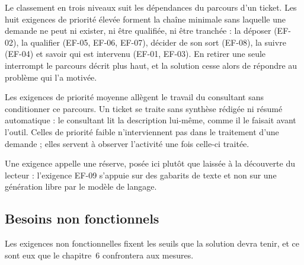 
Le classement en trois niveaux suit les dépendances du parcours d'un ticket. Les huit exigences de
priorité élevée forment la chaîne minimale sans laquelle une demande ne peut ni exister, ni être
qualifiée, ni être tranchée : la déposer (EF-02), la qualifier (EF-05, EF-06, EF-07), décider de son
sort (EF-08), la suivre (EF-04) et savoir qui est intervenu (EF-01, EF-03). En retirer une seule
interrompt le parcours décrit plus haut, et la solution cesse alors de répondre au problème qui
l'a motivée.

Les exigences de priorité moyenne allègent le travail du consultant sans conditionner ce parcours.
Un ticket se traite sans synthèse rédigée ni résumé automatique : le consultant lit la description
lui-même, comme il le faisait avant l'outil. Celles de priorité faible n'interviennent pas dans le
traitement d'une demande ; elles servent à observer l'activité une fois celle-ci traitée.

Une exigence appelle une réserve, posée ici plutôt que laissée à la découverte du lecteur :
l'exigence EF-09 s'appuie sur des gabarits de texte et non sur une génération libre par le modèle
de langage.

\subsection{Besoins non fonctionnels}

Les exigences non fonctionnelles fixent les seuils que la solution devra tenir, et ce sont eux que le chapitre~6 confrontera aux mesures.

